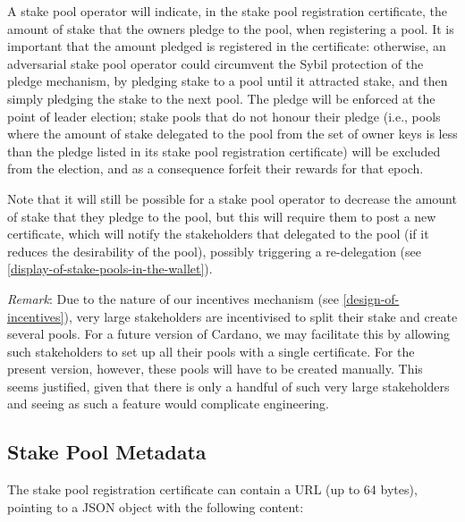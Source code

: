 \documentclass[11pt,a4paper]{article}
\begin{document}
A stake pool operator will indicate, in the stake pool registration
certificate, the amount of stake that the owners pledge to
the pool, when registering a pool. It is important that the amount
pledged is registered in the certificate: otherwise,
an adversarial stake pool operator could circumvent the Sybil protection
of the pledge mechanism, by pledging stake to a pool until it attracted stake,
and then simply pledging the stake to the next pool. The pledge will be
enforced at the point of leader election; stake pools that do not
honour their pledge (i.e., pools where the amount of stake delegated
to the pool from the set of owner keys is less than the pledge listed
in its stake pool registration certificate) will be excluded from the election,
and as a consequence forfeit their rewards for that epoch.

Note that it will still be possible for a stake pool operator to decrease the
amount of stake that they pledge to the pool, but this will require them to post
a new certificate, which will notify the stakeholders that delegated to the pool
(if it reduces the desirability of the pool), possibly triggering a
re-delegation (see \cref{display-of-stake-pools-in-the-wallet}).

\emph{Remark}: Due to the nature of our incentives mechanism (see
\cref{design-of-incentives}), very large stakeholders are
incentivised to split their stake and create several pools. For a future
version of Cardano, we may facilitate this by allowing such
stakeholders to set up all their pools with a single certificate. For
the present version, however, these pools will have to be created
manually. This seems justified, given that there is only a handful of
such very large stakeholders and seeing as such a feature would
complicate engineering.

\subsection{Stake Pool Metadata}
\label{stake-pool-metadata}

The stake pool registration certificate can contain a URL (up to 64 bytes),
pointing to a JSON object with the following content:
\end{document}
